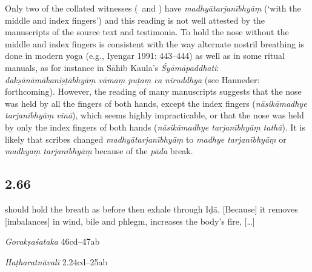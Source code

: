 \begin{ekdosis}
\begin{philcomm}[hp02_065]
Only two of the collated witnesses (\gammaTwo\ and \zetaThree) have \emph{madhyātarjanībhyāṃ} (`with the middle and index fingers') and this reading is not well attested by the manuscripts of the source text and testimonia. To hold the nose without the middle and index fingers is consistent with the way alternate nostril breathing is done in modern yoga (e.g., Iyengar 1991: 443–444) as well as in some ritual manuals, as for instance in 
Sāhib Kaula's \emph{Śyāmāpaddhati}: \emph{dakṣānāmākaniṣṭābhyāṃ vāmaṃ puṭaṃ ca niruddhya} (see Hanneder: forthcoming).   %
However, the reading of many manuscripts suggests  that the nose was held by all the fingers of both hands, except the index fingers (\emph{nāsikāmadhye tarjanībhyāṃ vinā}), which seems highly impracticable, or that the nose was held by only the index fingers of both hands (\emph{nāsikāmadhye tarjanībhyāṃ tathā}). It is likely that scribes changed \emph{madhyātarjanībhyāṃ} to \emph{madhye tarjanībhyāṃ} or \emph{madhyaṃ tarjanībhyāṃ} because of the \emph{pāda} break. 
\end{philcomm}

\subsection*{2.66}
\begin{translation} should hold the breath as before then exhale through Iḍā. [Because] it removes [imbalances] in wind, bile and phlegm, increases the body’s fire, [\dots]

\end{translation}

\begin{sources}[hp02_066]
\emph{Gorakṣaśataka} 46cd–47ab

\begin{versinnote}
\end{versinnote}
\end{sources}

\begin{testimonia}[hp02_066]
\emph{Haṭharatnāvalī} 2.24cd–25ab

\begin{versinnote}
\end{versinnote}


\end{testimonia}
\end{ekdosis}
